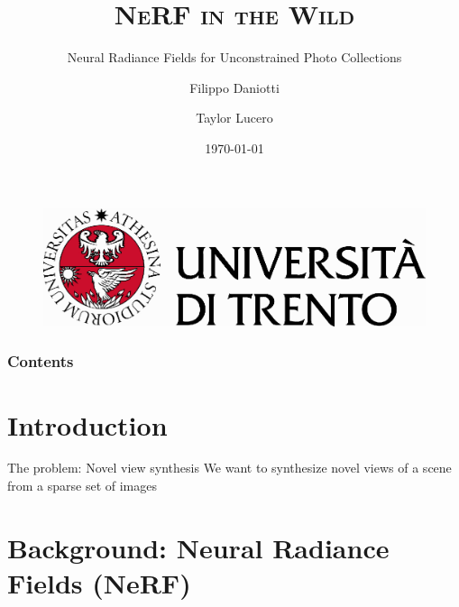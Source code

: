 \documentclass[aspectratio=1610]{beamer}
\author[Daniotti \and Lucero]{Filippo Daniotti \and Taylor Lucero}
\title[NeRF-W]{\textsc{NeRF in the Wild}}
\subtitle{Neural Radiance Fields for Unconstrained Photo Collections}
\institute[DISI - UniTN]{Department of Information Engineering\\and Computer Science}
\date{\today}
\begin{document}
\begin{frame}
    \titlepage
    \begin{figure}[H]
        \begin{center}
            \includegraphics[width=0.4\linewidth]{marchio_unitrento_colore_it_202002.eps}
        \end{center}
    \end{figure}
\end{frame}


\begin{frame}
    \frametitle{Contents}
    \tableofcontents[sectionstyle=show,subsectionstyle=show,subsubsectionstyle=show/shaded/hide]
\end{frame}

\section{Introduction}
\begin{frame}{The problem: Novel view synthesis}
    We want to synthesize novel views of a scene from a sparse set of images  
    \bigskip
    \begin{figure}[H]
    \end{figure}
\end{frame}

\section{Background: Neural Radiance Fields (NeRF)}
\end{document}
